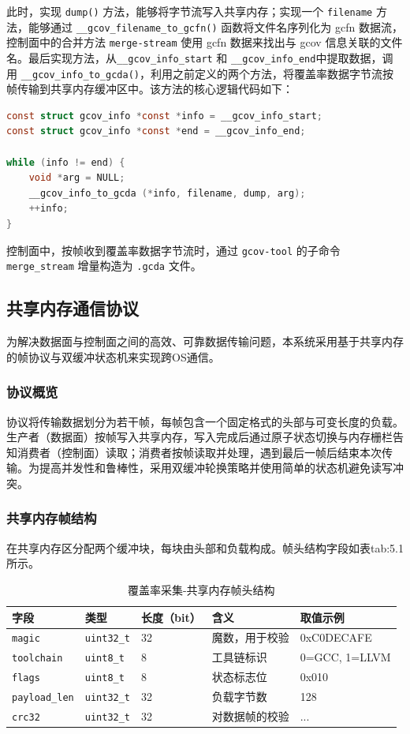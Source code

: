 此时，实现 \verb|dump()| 方法，能够将字节流写入共享内存；实现一个 \verb|filename| 方法，能够通过 \verb|__gcov_filename_to_gcfn()| 函数将文件名序列化为 gcfn 数据流，控制面中的合并方法 \verb|merge-stream| 使用 gcfn 数据来找出与 gcov 信息关联的文件名。最后实现方法，从\verb|__gcov_info_start| 和 \verb|__gcov_info_end|中提取数据，调用 \verb|__gcov_info_to_gcda()|，利用之前定义的两个方法，将覆盖率数据字节流按帧传输到共享内存缓冲区中。该方法的核心逻辑代码如下：

\begin{lstlisting}[language=c, basicstyle=\ttfamily\small, breaklines=true, breakindent=2em, frame=tb]
const struct gcov_info *const *info = __gcov_info_start;
const struct gcov_info *const *end = __gcov_info_end;

while (info != end) {
    void *arg = NULL;
    __gcov_info_to_gcda (*info, filename, dump, arg);
    ++info;
}
\end{lstlisting}

控制面中，按帧收到覆盖率数据字节流时，通过 \verb|gcov-tool| 的子命令 \verb|merge_stream| 增量构造为 \verb|.gcda| 文件。

\subsection{共享内存通信协议}\label{sec:5.2.4}
为解决数据面与控制面之间的高效、可靠数据传输问题，本系统采用基于共享内存的帧协议与双缓冲状态机来实现跨OS通信。

\subsubsection{协议概览}
协议将传输数据划分为若干帧，每帧包含一个固定格式的头部与可变长度的负载。生产者（数据面）按帧写入共享内存，写入完成后通过原子状态切换与内存栅栏告知消费者（控制面）读取；消费者按帧读取并处理，遇到最后一帧后结束本次传输。为提高并发性和鲁棒性，采用双缓冲轮换策略并使用简单的状态机避免读写冲突。

\subsubsection{共享内存帧结构}
在共享内存区分配两个缓冲块，每块由头部和负载构成。帧头结构字段如表{tab:5.1}所示。

\begin{table}
  \centering
  \caption{覆盖率采集-共享内存帧头结构}
  \label{tab:5.1}
  \begin{tabular}{lllll}
    \toprule
    字段 & 类型 & 长度（bit） & 含义 & 取值示例 \\
    \midrule
    \verb|magic| & \verb|uint32_t| & 32 & 魔数，用于校验 & 0xC0DECAFE \\
    \verb|toolchain| & \verb|uint8_t| & 8 & 工具链标识 & 0=GCC, 1=LLVM\\
    \verb|flags| & \verb|uint8_t| & 8 & 状态标志位& 0x010\\
    \verb|payload_len| & \verb|uint32_t| & 32 & 负载字节数 & 128 \\
    \verb|crc32| & \verb|uint32_t| & 32 & 对数据帧的校验 & ... \\
    \bottomrule
  \end{tabular}
\end{table}

